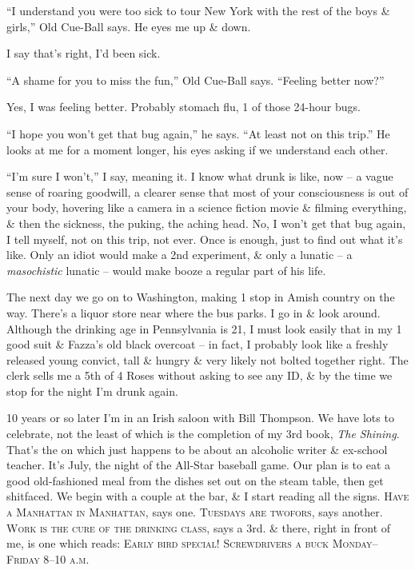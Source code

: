 \documentclass{article}
\numberwithin{equation}{section}
\begin{document}
``I understand you were too sick to tour New York with the rest of the boys \& girls,'' Old Cue-Ball says. He eyes me up \& down.

I say that's right, I'd been sick.

``A shame for you to miss the fun,'' Old Cue-Ball says. ``Feeling better now?''

Yes, I was feeling better. Probably stomach flu, 1 of those 24-hour bugs.

``I hope you won't get that bug again,'' he says. ``At least not on this trip.'' He looks at me for a moment longer, his eyes asking if we understand each other.

``I'm sure I won't,'' I say, meaning it. I know what drunk is like, now -- a vague sense of roaring goodwill, a clearer sense that most of your consciousness is out of your body, hovering like a camera in a science fiction movie \& filming everything, \& then the sickness, the puking, the aching head. No, I won't get that bug again, I tell myself, not on this trip, not ever. Once is enough, just to find out what it's like. Only an idiot would make a 2nd experiment, \& only a lunatic -- a \textit{masochistic} lunatic -- would make booze a regular part of his life.

The next day we go on to Washington, making 1 stop in Amish country on the way. There's a liquor store near where the bus parks. I go in \& look around. Although the drinking age in Pennsylvania is 21, I must look easily that in my 1 good suit \& Fazza's old black overcoat -- in fact, I probably look like a freshly released young convict, tall \& hungry \& very likely not bolted together right. The clerk sells me a 5th of 4 Roses without asking to see any ID, \& by the time we stop for the night I'm drunk again.

10 years or so later I'm in an Irish saloon with Bill Thompson. We have lots to celebrate, not the least of which is the completion of my 3rd book, \textit{The Shining}. That's the on which just happens to be about an alcoholic writer \& ex-school teacher. It's July, the night of the All-Star baseball game. Our plan is to eat a good old-fashioned meal from the dishes set out on the steam table, then get shitfaced. We begin with a couple at the bar, \& I start reading all the signs. \textsc{Have a Manhattan in Manhattan}, says one. \textsc{Tuesdays are twofors}, says another. \textsc{Work is the cure of the drinking class}, says a 3rd. \& there, right in front of me, is one which reads: \textsc{Early bird special! Screwdrivers a buck Monday--Friday 8--10 a.m.}
\end{document}
